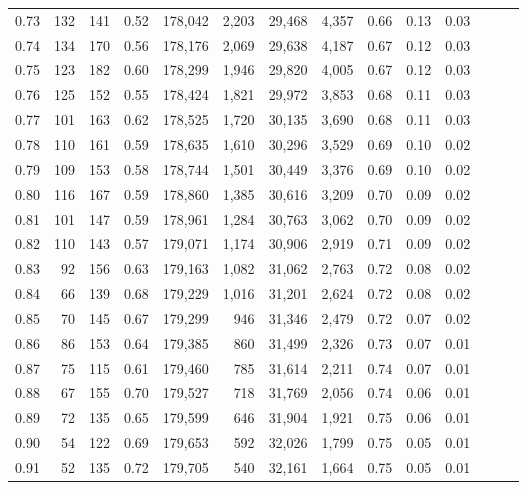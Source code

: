 \begin{tabular}{rrrrrrrrrrrrrr}
0.73 &     132 &  141 &  0.52 &  178,042 &    2,203 &  29,468 &   4,357 &  0.66 &  0.13 &      0.03 \\
0.74 &     134 &  170 &  0.56 &  178,176 &    2,069 &  29,638 &   4,187 &  0.67 &  0.12 &      0.03 \\
0.75 &     123 &  182 &  0.60 &  178,299 &    1,946 &  29,820 &   4,005 &  0.67 &  0.12 &      0.03 \\
0.76 &     125 &  152 &  0.55 &  178,424 &    1,821 &  29,972 &   3,853 &  0.68 &  0.11 &      0.03 \\
0.77 &     101 &  163 &  0.62 &  178,525 &    1,720 &  30,135 &   3,690 &  0.68 &  0.11 &      0.03 \\
0.78 &     110 &  161 &  0.59 &  178,635 &    1,610 &  30,296 &   3,529 &  0.69 &  0.10 &      0.02 \\
0.79 &     109 &  153 &  0.58 &  178,744 &    1,501 &  30,449 &   3,376 &  0.69 &  0.10 &      0.02 \\
0.80 &     116 &  167 &  0.59 &  178,860 &    1,385 &  30,616 &   3,209 &  0.70 &  0.09 &      0.02 \\
0.81 &     101 &  147 &  0.59 &  178,961 &    1,284 &  30,763 &   3,062 &  0.70 &  0.09 &      0.02 \\
0.82 &     110 &  143 &  0.57 &  179,071 &    1,174 &  30,906 &   2,919 &  0.71 &  0.09 &      0.02 \\
0.83 &      92 &  156 &  0.63 &  179,163 &    1,082 &  31,062 &   2,763 &  0.72 &  0.08 &      0.02 \\
0.84 &      66 &  139 &  0.68 &  179,229 &    1,016 &  31,201 &   2,624 &  0.72 &  0.08 &      0.02 \\
0.85 &      70 &  145 &  0.67 &  179,299 &      946 &  31,346 &   2,479 &  0.72 &  0.07 &      0.02 \\
0.86 &      86 &  153 &  0.64 &  179,385 &      860 &  31,499 &   2,326 &  0.73 &  0.07 &      0.01 \\
0.87 &      75 &  115 &  0.61 &  179,460 &      785 &  31,614 &   2,211 &  0.74 &  0.07 &      0.01 \\
0.88 &      67 &  155 &  0.70 &  179,527 &      718 &  31,769 &   2,056 &  0.74 &  0.06 &      0.01 \\
0.89 &      72 &  135 &  0.65 &  179,599 &      646 &  31,904 &   1,921 &  0.75 &  0.06 &      0.01 \\
0.90 &      54 &  122 &  0.69 &  179,653 &      592 &  32,026 &   1,799 &  0.75 &  0.05 &      0.01 \\
0.91 &      52 &  135 &  0.72 &  179,705 &      540 &  32,161 &   1,664 &  0.75 &  0.05 &      0.01 \\

\end{tabular}
